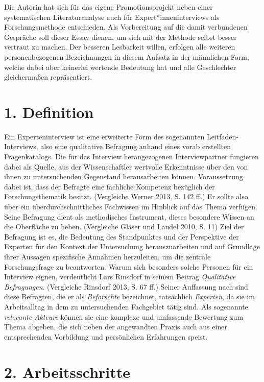 \documentclass[a4paper,
fontsize=11pt,
oneside,
numbers=noperiodatend,
parskip=half-,
bibliography=totoc,
final
]{scrartcl}
\begin{document}
\newpage

Die Autorin hat sich für das eigene Promotionsprojekt neben einer
systematischen Literaturanalyse auch für Expert*inneninterviews als
Forschungsmethode entschieden. Als Vorbereitung auf die damit
verbundenen Gespräche soll dieser Essay dienen, um sich mit der Methode
selbst besser vertraut zu machen. Der besseren Lesbarkeit willen,
erfolgen alle weiteren personenbezogenen Bezeichnungen in diesem Aufsatz
in der männlichen Form, welche dabei aber keinerlei wertende Bedeutung
hat und alle Geschlechter gleichermaßen repräsentiert.

\section{1. Definition}\label{definition}

Ein Experteninterview ist eine erweiterte Form des sogenannten
Leitfaden-Interviews, also eine qualitative Befragung anhand eines vorab
erstellten Fragenkatalogs. Die für das Interview herangezogenen
Interviewpartner fungieren dabei als Quelle, aus der Wissenschaftler
wertvolle Erkenntnisse über den von ihnen zu untersuchenden Gegenstand
herausarbeiten können. Voraussetzung dabei ist, dass der Befragte eine
fachliche Kompetenz bezüglich der Forschungsthematik besitzt.
(Vergleiche Werner 2013, S. 142 ff.) Er sollte also über ein
überdurchschnittliches Fachwissen im Hinblick auf das Thema verfügen.
Seine Befragung dient als methodisches Instrument, dieses besondere
Wissen an die Oberfläche zu heben. (Vergleiche Gläser und Laudel 2010,
S. 11) Ziel der Befragung ist es, die Bedeutung des Standpunktes und der
Perspektive der Experten für den Kontext der Untersuchung
herauszuarbeiten und auf Grundlage ihrer Aussagen spezifische Annahmen
herzuleiten, um die zentrale Forschungsfrage zu beantworten. Warum sich
besonders solche Personen für ein Interview eignen, verdeutlicht Lars
Rinsdorf in seinem Beitrag \emph{Qualitative Befragungen}. (Vergleiche
Rinsdorf 2013, S. 67 ff.) Seiner Auffassung nach sind diese Befragten,
die er als \emph{Beforschte} bezeichnet, tatsächlich \emph{Experten}, da
sie im Arbeitsalltag in dem zu untersuchenden Fachgebiet tätig sind. Als
sogenannte \emph{relevante Akteure} können sie eine komplexe und
umfassende Bewertung zum Thema abgeben, die sich neben der angewandten
Praxis auch aus einer entsprechenden Vorbildung und persönlichen
Erfahrungen speist.

\section{2. Arbeitsschritte}\label{arbeitsschritte}
\end{document}

